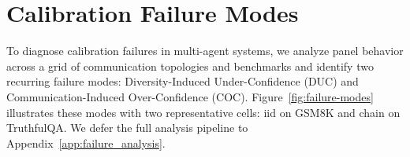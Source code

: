 \section{Calibration Failure Modes}
\label{sec:failure_modes}
To diagnose calibration failures in multi-agent systems, we analyze panel behavior across a grid of communication topologies and benchmarks 
and identify two recurring failure modes: Diversity-Induced Under-Confidence (DUC) and Communication-Induced Over-Confidence (COC). 
Figure~\ref{fig:failure-modes} illustrates these modes with two representative cells: iid on GSM8K and chain on TruthfulQA. 
We defer the full analysis pipeline to Appendix~\ref{app:failure_analysis}. 





